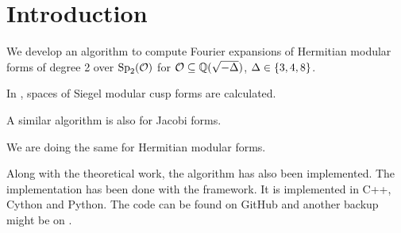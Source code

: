
\section{Introduction}

We develop an algorithm to compute Fourier expansions of Hermitian modular forms of degree 2 over $\operatorname{Sp}_2(\mathcal{O})$ for $\mathcal{O} \subseteq \mathbb{Q}(\sqrt{-\Delta})$, $\Delta \in \Set{3,4,8}$.

In \cite{PoorYuen07Comp}, spaces of Siegel modular cusp forms are calculated.

A similar algorithm is also \cite[Algorithm 4.3]{Raum12Jacobi} for Jacobi forms.

We are doing the same for Hermitian modular forms.

Along with the theoretical work, the algorithm has also been implemented. The implementation has been done with the \cite{sage} framework. It is implemented in C++, Cython and Python. The code can be found on GitHub \cite{Zeyer13Github} and another backup might be on \cite{Zeyer13Homepage}.
